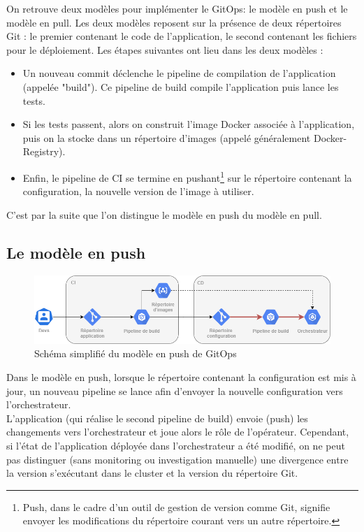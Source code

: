\documentclass[11pt,fleqn]{book} %
\begin{document}
On retrouve deux modèles pour implémenter le GitOps: le modèle en push et le modèle en pull. Les deux modèles reposent sur la présence de deux répertoires Git : le premier contenant le code de l'application, le second contenant les fichiers pour le déploiement. Les étapes suivantes ont lieu dans les deux modèles : 
\begin{itemize}
     \item Un nouveau commit déclenche le pipeline de compilation de l'application (appelée "build"). Ce pipeline de build compile l'application puis lance les tests.
    \item Si les tests passent, alors on construit l'image Docker associée à l'application, puis on la  stocke dans un répertoire d'images (appelé généralement Docker-Registry).
    \item Enfin, le pipeline de CI se termine en pushant\footnote{Push, dans le cadre d'un outil de gestion de version comme Git, signifie envoyer les modifications du répertoire courant vers un autre répertoire.} sur le répertoire contenant la configuration, la nouvelle version de l'image à utiliser.
\end{itemize}
C'est par la suite que l'on distingue le modèle en push du modèle en pull.

\subsection{Le modèle en push}
\begin{figure}[H]
\renewcommand{\figurename}{Schéma}
\hspace{-1cm}
\includegraphics[scale=0.6]{Pictures/CI-CD/push-model.png}
\captionsetup{margin=1.5cm,format=hang,justification=justified}
\caption[]{Schéma simplifié du modèle en push de GitOps \newline}
\end{figure}

Dans le modèle en push, lorsque le répertoire contenant la configuration est mis à jour, un nouveau pipeline se lance afin d'envoyer la nouvelle configuration vers l'orchestrateur.\\

L'application (qui réalise le second pipeline de build) envoie (push) les changements vers l'orchestrateur et joue alors le rôle de l'opérateur. Cependant, si l'état de l'application déployée dans l'orchestrateur a été modifié, on ne peut pas distinguer (sans monitoring ou investigation manuelle) une divergence entre la version s'exécutant dans le cluster et la version du répertoire Git. 
\end{document}
